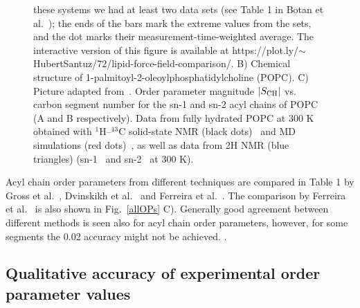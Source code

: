 \documentclass[aps,prl,superscriptaddress,twocolumn]{revtex4}
\begin{document}
\begin{figure}[]
{    these systems we had at least two data sets (see Table 1 in Botan et al.~\cite{botan15});
    the ends of the bars mark the extreme values from the sets, and the dot marks their measurement-time-weighted average. 
    The interactive version of this figure is available at  https://plot.ly/$\sim$HubertSantuz/72/lipid-force-field-comparison/.
    B) Chemical structure of 1-palmitoyl-2-oleoylphosphatidylcholine (POPC).
    C) Picture adapted from~\cite{ferreira13}.
    Order parameter magnitude $|S_{{\rm CH}}|$ vs. carbon segment number for the
    sn-1 and sn-2 acyl chains of POPC (A and B respectively). Data from fully hydrated POPC at
    300 K obtained with $^1$H–$^{13}$C solid-state NMR (black dots)~\cite{ferreira13} and MD simulations
    (red dots)~\cite{ferreira13}, as well as data from 2H NMR (blue triangles) (sn-1~\cite{seelig78} and
    sn-2~\cite{seelig78,perly85} at 300 K).
  }
\end{figure}

Acyl chain order parameters from different techniques are compared in Table 1 by Gross et al.~\cite{gross97}, 
Dvinskikh et al.~\cite{dvinskikh05a} and Ferreira et al.~\cite{ferreira13}. The comparison by Ferreira et al.~\cite{ferreira13} 
is also shown in Fig.~\ref{allOPs} C). Generally good agreement between different methods is seen also for
acyl chain order parameters, however, for some segments the 0.02 accuracy might not be achieved.
.



\subsection{Qualitative accuracy of experimental order parameter values}
\end{document}

